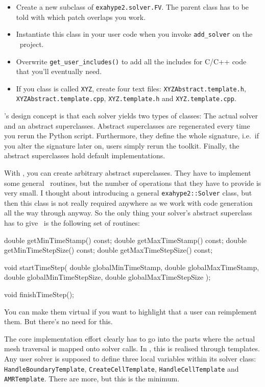 \begin{itemize}
  \item Create a new subclass of \texttt{exahype2.solver.FV}. The parent class
  has to be told with which patch overlaps you work.
  \item Instantiate this class in your user code when you invoke
  \texttt{add\_solver} on the \ExaHyPE\ project.
  \item Overwrite \texttt{get\_user\_includes()} to add all the includes for
  C/C++ code that you'll eventually need. 
  \item If you class is called \texttt{XYZ}, create four text files:
  \texttt{XYZAbstract.template.h}, \linebreak \texttt{XYZAbstract.template.cpp},
  \texttt{XYZ.template.h} and \texttt{XYZ.template.cpp}.
\end{itemize}

\noindent
\ExaHyPE's design concept is that each solver yields two types of classes:
The actual solver and an abstract superclasses. 
Abstract superclasses are regenerated every time you rerun the Python script.
Furthermore, they define the whole signature, i.e.~if you alter the signature
later on, users simply rerun the toolkit. 
Finally, the abstract superclasses hold default implementations.


With \Peano, you can create arbitrary abstract superclasses. 
They have to implement some general \ExaHyPE\ routines, but the number of operations that they have to
provide is very small.
I thought about introducing a general \texttt{exahype2::Solver} class, but then
this class is not really required anywhere as we work with code generation all
the way through anyway. 
So the only thing your solver's abstract superclass has to give \ExaHyPE\ is the
following set of routines:

\begin{code}
  double getMinTimeStamp() const;
  double getMaxTimeStamp() const;
  double getMinTimeStepSize() const;
  double getMaxTimeStepSize() const;

  void startTimeStep(
      double globalMinTimeStamp,
      double globalMaxTimeStamp,
      double globalMinTimeStepSize,
      double globalMaxTimeStepSize
  );

  void finishTimeStep();
\end{code}
\noindent
You can make them virtual if you want to highlight that a user can reimplement
them. 
But there's no need for this. 


The core implementation effort clearly has to go into the parts where the actual
mesh traversal is mapped onto solver calls.
In \ExaHyPE, this is realised through templates. 
Any user solver is supposed to define three local variables within its solver
class:
\texttt{HandleBoundaryTemplate}, 
\texttt{CreateCellTemplate}, \texttt{HandleCellTemplate} and
\texttt{AMRTemplate}.
There are more, but this is the minimum.


